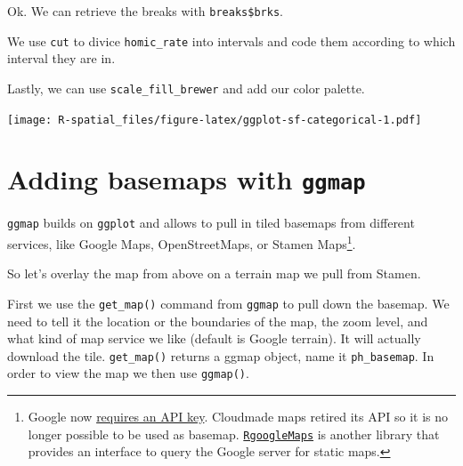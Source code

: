 \documentclass[]{book}
\newenvironment{Shaded}{\begin{snugshade}}{\end{snugshade}}
\newcommand{\KeywordTok}[1]{\textcolor[rgb]{0.13,0.29,0.53}{\textbf{#1}}}
\newcommand{\DataTypeTok}[1]{\textcolor[rgb]{0.13,0.29,0.53}{#1}}
\newcommand{\StringTok}[1]{\textcolor[rgb]{0.31,0.60,0.02}{#1}}
\newcommand{\OperatorTok}[1]{\textcolor[rgb]{0.81,0.36,0.00}{\textbf{#1}}}
\newcommand{\NormalTok}[1]{#1}
\let\rmarkdownfootnote\footnote%
\def\footnote{\protect\rmarkdownfootnote}
\begin{document}
Ok. We can retrieve the breaks with \texttt{breaks\$brks}.

We use \texttt{cut} to divice \texttt{homic\_rate} into intervals and
code them according to which interval they are in.

Lastly, we can use \texttt{scale\_fill\_brewer} and add our color
palette.

\begin{Shaded}
\end{Shaded}

\texttt{[image: R-spatial\_files/figure-latex/ggplot-sf-categorical-1.pdf]}

\section{\texorpdfstring{Adding basemaps with
\texttt{ggmap}}{Adding basemaps with ggmap}}\label{adding-basemaps-with-ggmap}

\texttt{ggmap} builds on \texttt{ggplot} and allows to pull in tiled
basemaps from different services, like Google Maps, OpenStreetMaps, or
Stamen Maps\footnote{Google now
  \href{https://cloud.google.com/maps-platform/.}{requires an API key}.
  Cloudmade maps retired its API so it is no longer possible to be used
  as basemap.
  \href{https://CRAN.R-project.org/package=RgoogleMaps}{\texttt{RgoogleMaps}}
  is another library that provides an interface to query the Google
  server for static maps.}.

So let's overlay the map from above on a terrain map we pull from
Stamen.

First we use the \texttt{get\_map()} command from \texttt{ggmap} to pull
down the basemap. We need to tell it the location or the boundaries of
the map, the zoom level, and what kind of map service we like (default
is Google terrain). It will actually download the tile.
\texttt{get\_map()} returns a ggmap object, name it
\texttt{ph\_basemap}. In order to view the map we then use
\texttt{ggmap()}.
\end{document}
